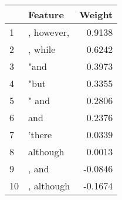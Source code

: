 \begin{tabular}{llr}
\toprule
{} &     Feature &  Weight \\
\midrule
1  &  , however, &  0.9138 \\
2  &     , while &  0.6242 \\
3  &        "and &  0.3973 \\
4  &        "but &  0.3355 \\
5  &       " and &  0.2806 \\
6  &         and &  0.2376 \\
7  &      'there &  0.0339 \\
8  &    although &  0.0013 \\
9  &       , and & -0.0846 \\
10 &  , although & -0.1674 \\
\bottomrule
\end{tabular}
